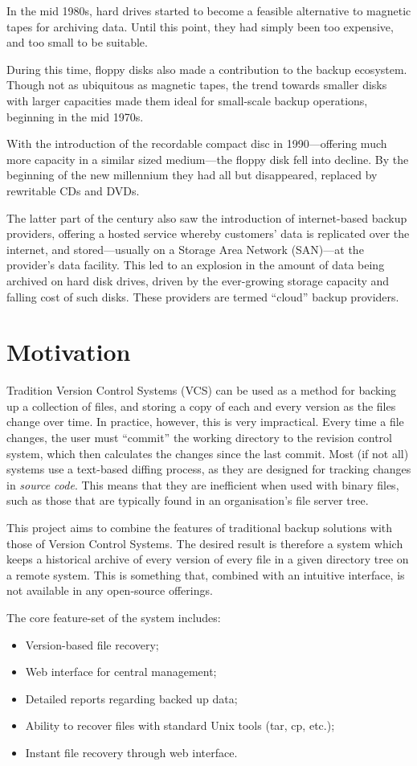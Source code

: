 In the mid 1980s, hard drives started to become a feasible alternative to
magnetic tapes for archiving data. Until this point, they had simply been too
expensive, and too small to be suitable.

During this time, floppy disks also made a contribution to the backup
ecosystem. Though not as ubiquitous as magnetic tapes, the trend towards
smaller disks with larger capacities made them ideal for small-scale backup
operations, beginning in the mid 1970s.

With the introduction of the recordable compact disc in 1990---offering
much more capacity in a similar sized medium---the floppy disk fell into
decline. By the beginning of the new millennium they had all but disappeared,
replaced by rewritable CDs and DVDs.

The latter part of the century also saw the introduction of internet-based
backup providers, offering a hosted service whereby customers' data is
replicated over the internet, and stored---usually on a Storage Area Network
(SAN)---at the provider's data facility. This led to an explosion in the amount
of data being archived on hard disk drives, driven by the ever-growing storage
capacity and falling cost of such disks. These providers are termed ``cloud''
backup providers.

\section{Motivation}

Tradition Version Control Systems (VCS) can be used as a method for backing up
a collection of files, and storing a copy of each and every version as the
files change over time. In practice, however, this is very impractical. Every
time a file changes, the user must ``commit'' the working directory to the
revision control system, which then calculates the changes since the last
commit. Most (if not all) systems use a text-based diffing process, as they are
designed for tracking changes in \emph{source code}. This means that they are
inefficient when used with binary files, such as those that are typically found
in an organisation's file server tree.

This project aims to combine the features of traditional backup solutions with
those of Version Control Systems. The desired result is therefore a system
which keeps a historical archive of every version of every file in a given
directory tree on a remote system. This is something that, combined with an
intuitive interface, is not available in any open-source offerings.

The core feature-set of the system includes:

\begin{itemize}
    \item Version-based file recovery;
    \item Web interface for central management;
    \item Detailed reports regarding backed up data;
    \item Ability to recover files with standard Unix tools (tar, cp, etc.);
    \item Instant file recovery through web interface.
\end{itemize}
